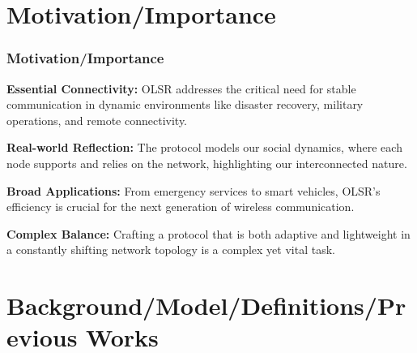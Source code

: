 \documentclass[11pt]{beamer}              %
\begin{document}




\section{Motivation/Importance}
\begin{frame}
\frametitle{Motivation/Importance}
\textbf{Essential Connectivity:} OLSR addresses the critical need for stable communication in dynamic environments like disaster recovery, military operations, and remote connectivity.

\textbf{Real-world Reflection:} The protocol models our social dynamics, where each node supports and relies on the network, highlighting our interconnected nature.

\textbf{Broad Applications:} From emergency services to smart vehicles, OLSR's efficiency is crucial for the next generation of wireless communication.

\textbf{Complex Balance:} Crafting a protocol that is both adaptive and lightweight in a constantly shifting network topology is a complex yet vital task.
\end{frame}

\section{Background/Model/Definitions/Previous Works}
\end{document}
